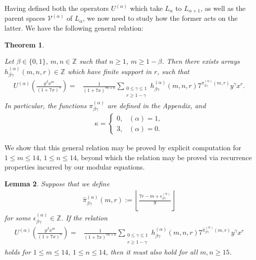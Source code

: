 \documentclass[reqno]{amsart}
\newtheorem{theorem}{Theorem}[section]
\newtheorem{lemma}[theorem]{Lemma}
\theoremstyle{definition}
\theoremstyle{remark}
\numberwithin{equation}{section}
\begin{document}
Having defined both the operators $U^{(\alpha)}$ which take $L_{\alpha}$ to $L_{\alpha+1}$, as well as the parent spaces $\mathcal{V}^{(\alpha)}$ of $L_{\alpha}$, we now need to study how the former acts on the latter.  We have the following general relation:

\begin{theorem}\label{thmrelAA}

Let $\beta\in\{0,1\}$, $m,n\in\mathbb{Z}$ such that $n\ge 1$, $m\ge 1-\beta$.  Then there exists arrays $h^{(\alpha)}_{\beta\gamma}(m,n,r)\in \mathbb{Z}$ which have finite support in $r$, such that
\begin{align*}
U^{(\alpha)}\left( \frac{y^{\beta}x^{m}}{(1+7x)^{n}} \right) =& \frac{1}{(1+7x)^{7n+\kappa}}\sum_{\substack{0\le\gamma\le 1\\ r\ge 1-\gamma}} h^{(\alpha)}_{\beta\gamma}(m,n,r) 7^{\pi^{(\alpha)}_{\beta\gamma}(m,r)}y^{\gamma}x^r.
\end{align*}  In particular, the functions $\pi^{(\alpha)}_{\beta\gamma}$ are defined in the Appendix, and
\begin{align*}
\kappa = \begin{cases}
0, & (\alpha)=1,\\
3, & (\alpha)=0.
\end{cases}
\end{align*}
\end{theorem}

We show that this general relation may be proved by explicit computation for $1\le m\le 14$, $1\le n\le 14$, beyond which the relation may be proved via recurrence properties incurred by our modular equations.

\begin{lemma}\label{lowerboundpiabc}
Suppose that we define 
\begin{align}
\hat{\pi}^{(\alpha)}_{\beta\gamma}(m,r) := \left\lfloor \frac{7r-m+\epsilon^{(\alpha)}_{\beta\gamma}}{9} \right\rfloor\label{pihatvalues}
\end{align} for some $\epsilon^{(\alpha)}_{\beta\gamma}\in\mathbb{Z}$.  If the relation
\begin{align}
U^{(\alpha)}\left( \frac{y^{\beta}x^{m}}{(1+7x)^{n}} \right) =& \frac{1}{(1+7x)^{7n+\kappa}}\sum_{\substack{0\le\gamma\le 1\\ r\ge 1-\gamma}} h^{(\alpha)}_{\beta\gamma}(m,n,r) 7^{\hat{\pi}^{(\alpha)}_{\beta\gamma}(m,r)}y^{\gamma}x^r\label{lowerbounduaymoz}
\end{align} holds for $1\le m\le 14$, $1\le n\le 14$, then it must also hold for all $m,n\ge 15$.
\end{lemma}
\end{document}
